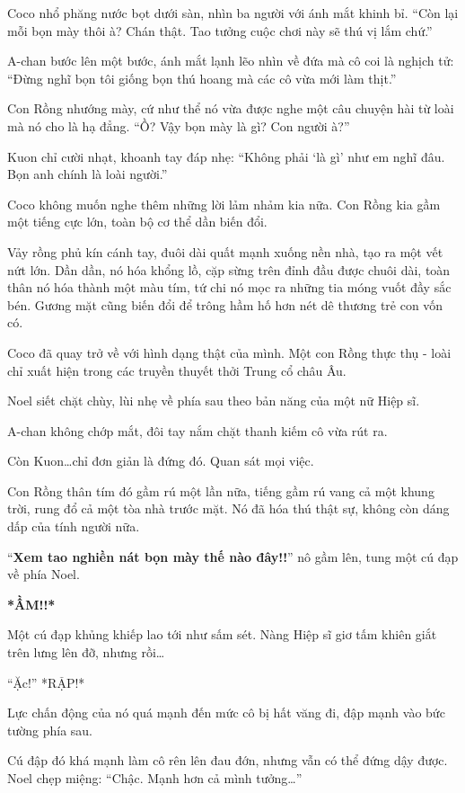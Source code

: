 \documentclass[../main.tex]{subfiles}
\begin{document}
Coco nhổ phăng nước bọt dưới sàn, nhìn ba người với ánh mắt khinh bỉ. ``Còn lại mỗi bọn mày thôi à? Chán thật. Tao tưởng cuộc chơi này sẽ thú vị lắm chứ.''

A-chan bước lên một bước, ánh mắt lạnh lẽo nhìn về đứa mà cô coi là nghịch tử: ``Đừng nghĩ bọn tôi giống bọn thú hoang mà các cô vừa mới làm thịt.''

Con Rồng nhướng mày, cứ như thể nó vừa được nghe một câu chuyện hài từ loài mà nó cho là hạ đẳng. ``Ồ? Vậy bọn mày là gì? Con người à?''

Kuon chỉ cười nhạt, khoanh tay đáp nhẹ: ``Không phải `là gì' như em nghĩ đâu. Bọn anh chính là loài người.''

Coco không muốn nghe thêm những lời lảm nhảm kia nữa. Con Rồng kia gầm một tiếng cực lớn, toàn bộ cơ thể dần biến đổi.

Vảy rồng phủ kín cánh tay, đuôi dài quất mạnh xuống nền nhà, tạo ra một vết nứt lớn. Dần dần, nó hóa khổng lồ, cặp sừng trên đỉnh đầu được chuôi dài, toàn thân nó hóa thành một màu tím, tứ chi nó mọc ra những tia móng vuốt đầy sắc bén. Gương mặt cũng biến đổi để trông hầm hố hơn nét dê thương trẻ con vốn có.

Coco đã quay trở về với hình dạng thật của mình. Một con Rồng thực thụ - loài chỉ xuất hiện trong các truyền thuyết thởi Trung cổ châu Âu.

Noel siết chặt chùy, lùi nhẹ về phía sau theo bản năng của một nữ Hiệp sĩ.

A-chan không chớp mắt, đôi tay nắm chặt thanh kiếm cô vừa rút ra.

Còn Kuon\dots chỉ đơn giản là đứng đó. Quan sát mọi việc.

Con Rồng thân tím đó gầm rú một lần nữa, tiếng gầm rú vang cả một khung trời, rung đổ cả một tòa nhà trước mặt. Nó đã hóa thú thật sự, không còn dáng dấp của tính người nữa.

``\textbf{Xem tao nghiền nát bọn mày thế nào đây!!}'' nô gầm lên, tung một cú đạp về phía Noel.

\textbf{*ẦM!!*}

Một cú đạp khủng khiếp lao tới như sấm sét. Nàng Hiệp sĩ giơ tấm khiên giắt trên lưng lên đỡ, nhưng rồi\dots

``Ặc!'' *RẬP!*

Lực chấn động của nó quá mạnh đến mức cô bị hất văng đi, đập mạnh vào bức tường phía sau.

Cú đập đó khá mạnh làm cô rên lên đau đớn, nhưng vẫn có thể đứng dậy được. Noel chẹp miệng: ``Chậc. Mạnh hơn cả mình tưởng\dots''
\end{document}
